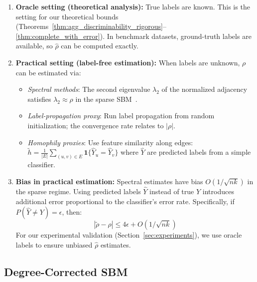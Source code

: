\begin{remark}
\begin{enumerate}
    \item \textbf{Oracle setting (theoretical analysis):} True labels are known. This is the setting for our theoretical bounds (Theorems~\ref{thm:agg_discriminability_rigorous}--\ref{thm:complete_with_error}). In benchmark datasets, ground-truth labels are available, so $\hat{\rho}$ can be computed exactly.

    \item \textbf{Practical setting (label-free estimation):} When labels are unknown, $\rho$ can be estimated via:
    \begin{itemize}
        \item \textit{Spectral methods}: The second eigenvalue $\lambda_2$ of the normalized adjacency satisfies $\lambda_2 \approx \rho$ in the sparse SBM~\cite{abbe2018community}.
        \item \textit{Label-propagation proxy}: Run label propagation from random initialization; the convergence rate relates to $|\rho|$.
        \item \textit{Homophily proxies}: Use feature similarity along edges: $\tilde{h} = \frac{1}{|E|}\sum_{(u,v)\in E} \mathbf{1}\{\hat{Y}_u = \hat{Y}_v\}$ where $\hat{Y}$ are predicted labels from a simple classifier.
    \end{itemize}

    \item \textbf{Bias in practical estimation:} Spectral estimates have bias $O(1/\sqrt{nk})$ in the sparse regime. Using predicted labels $\hat{Y}$ instead of true $Y$ introduces additional error proportional to the classifier's error rate. Specifically, if $P(\hat{Y} \neq Y) = \epsilon$, then:
    \begin{equation}
        |\tilde{\rho} - \rho| \leq 4\epsilon + O(1/\sqrt{nk})
    \end{equation}
    For our experimental validation (Section~\ref{sec:experiments}), we use oracle labels to ensure unbiased $\hat{\rho}$ estimates.
\end{enumerate}
\end{remark}

\subsection{Degree-Corrected SBM}
\label{subsec:dcsbm_rigorous}

